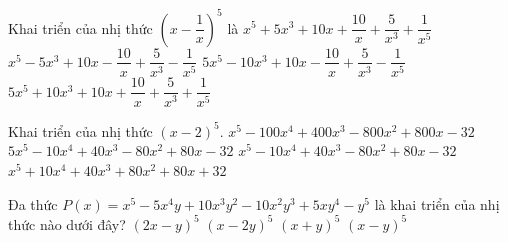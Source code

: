 \begin{ex}%
	Khai triển của nhị thức $\left(x-\dfrac{1}{x}\right)^5$  là
	 \choice
		{$x^5+5 x^3+10 x+\dfrac{10}{x}+\dfrac{5}{x^3}+\dfrac{1}{x^5}$} 
		{\True $x^5-5 x^3+10  x-\dfrac{10}{x}+\dfrac{5}{x^3}-\dfrac{1}{x^5}$}
		{$5  x^5-10 x^3+10 x-\dfrac{10}{x}+\dfrac{5}{x^3}-\dfrac{1}{x^5}$}
		 {$5 x^5+10 x^3+10 x+\dfrac{10}{x}+\dfrac{5}{x^3}+\dfrac{1}{x^5}$}
\end{ex}

\begin{ex}%
	 Khai triển của nhị thức $(x-2)^5$.
	\choice 
		 {$x^5-100x^4+400x^3-800x^2+800x-32$}
		{$5x^5-10x^4+40x^3-80x^2+80x-32$} 
		{\True  $x^5-10x^4+40x^3-80x^2+80x-32$}
		{$x^5+10x^4+40x^3+80x^2+80x+32$} 
\end{ex}

\begin{ex}%
	Đa thức $P(x)=x^5-5 x^4  y+10 x^3 y^2-10 x^2 y^3+5 x y^4-y^5$ là khai triển của nhị thức nào dưới đây?
	\choice 
		{$(2x-y)^5$} 
		{$(x-2 y)^5$} 
		{$(x+y)^5$} 
		 {\True $(x-y)^5$}
\end{ex}

